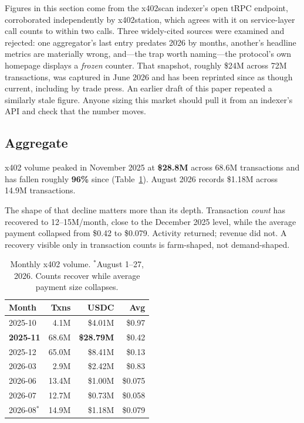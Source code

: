 \documentclass[10pt,letterpaper,twocolumn]{article}
\begin{document}
Figures in this section come from the x402scan indexer's open tRPC endpoint,
corroborated independently by x402station, which agrees with it on
service-layer call counts to within two calls. Three widely-cited sources were
examined and rejected: one aggregator's last entry predates 2026 by months,
another's headline metrics are materially wrong, and---the trap worth
naming---the protocol's own homepage displays a \emph{frozen} counter. That
snapshot, roughly \$24M across 72M transactions, was captured in June 2026 and
has been reprinted since as though current, including by trade press. An
earlier draft of this paper repeated a similarly stale figure. Anyone
sizing this market should pull it from an indexer's API and check that the
number moves.

\subsection{Aggregate}

x402 volume peaked in November 2025 at \textbf{\$28.8M} across 68.6M
transactions and has fallen roughly \textbf{96\%} since
(Table~\ref{tab:volume}). August 2026 records \$1.18M across 14.9M
transactions.

The shape of that decline matters more than its depth. Transaction \emph{count}
has recovered to 12--15M/month, close to the December 2025 level, while the
average payment collapsed from \$0.42 to \$0.079. Activity returned; revenue
did not. A recovery visible only in transaction counts is farm-shaped, not
demand-shaped.

\begin{table}[t]
\centering
\footnotesize
\begin{tabularx}{\columnwidth}{@{}lrrr@{}}
\toprule
\textbf{Month} & \textbf{Txns} & \textbf{USDC} & \textbf{Avg} \\
\midrule
2025-10 & 4.1M & \$4.01M & \$0.97 \\
\textbf{2025-11} & 68.6M & \textbf{\$28.79M} & \$0.42 \\
2025-12 & 65.0M & \$8.41M & \$0.13 \\
2026-03 & 2.9M & \$2.42M & \$0.83 \\
2026-06 & 13.4M & \$1.00M & \$0.075 \\
2026-07 & 12.7M & \$0.73M & \$0.058 \\
2026-08$^{*}$ & 14.9M & \$1.18M & \$0.079 \\
\bottomrule
\end{tabularx}
\caption{Monthly x402 volume. $^{*}$August 1--27, 2026. Counts recover while
average payment size collapses.}
\label{tab:volume}
\end{table}
\end{document}

